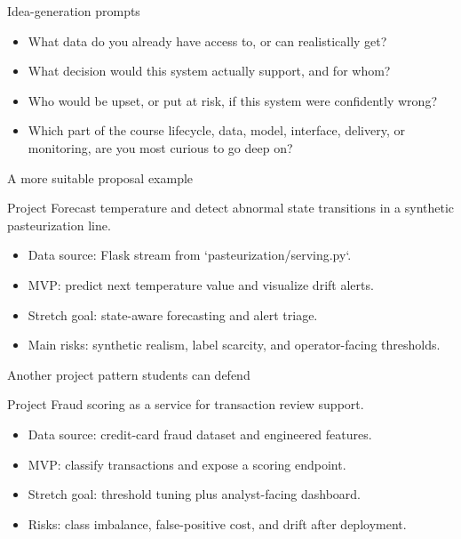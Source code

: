 \begin{frame}{Idea-generation prompts}
\begin{itemize}
\item What data do you already have access to, or can realistically get?
\item What decision would this system actually support, and for whom?
\item Who would be upset, or put at risk, if this system were confidently wrong?
\item Which part of the course lifecycle, data, model, interface, delivery, or monitoring, are you most curious to go deep on?
\end{itemize}
\coursefooter
\end{frame}

\begin{frame}{A more suitable proposal example}
\begin{block}{Project}
Forecast temperature and detect abnormal state transitions in a synthetic pasteurization line.
\end{block}
\begin{itemize}
\item Data source: Flask stream from `pasteurization/serving.py`.
\item MVP: predict next temperature value and visualize drift alerts.
\item Stretch goal: state-aware forecasting and alert triage.
\item Main risks: synthetic realism, label scarcity, and operator-facing thresholds.
\end{itemize}
\coursefooter
\end{frame}

\begin{frame}{Another project pattern students can defend}
\begin{block}{Project}
Fraud scoring as a service for transaction review support.
\end{block}
\begin{itemize}
\item Data source: credit-card fraud dataset and engineered features.
\item MVP: classify transactions and expose a scoring endpoint.
\item Stretch goal: threshold tuning plus analyst-facing dashboard.
\item Risks: class imbalance, false-positive cost, and drift after deployment.
\end{itemize}
\coursefooter
\end{frame}

